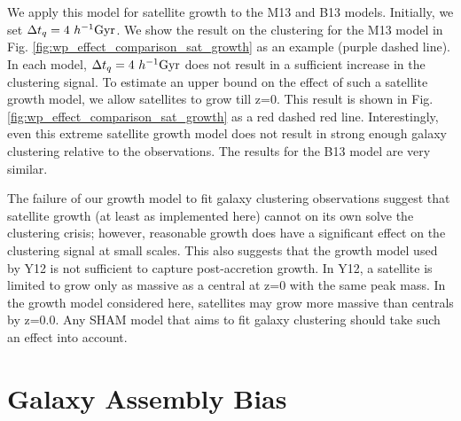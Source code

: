 \documentclass[a4paper,fleqn,usenatbib]{mnras}
\begin{document}
We apply this model for satellite growth to the M13 and B13 models.  Initially, we set $\Delta t_{q}=4 ~h^{-1}{\rm Gyr}$.  We show the result on the clustering for the M13 model in Fig. \ref{fig:wp_effect_comparison_sat_growth} as an example (purple dashed line).  In each model, $\Delta t_{q}=4 ~h^{-1}{\rm Gyr}$ does not result in a sufficient increase in the clustering signal.  To estimate an upper bound on the effect of such a satellite growth model, we allow satellites to grow till z=0.  This result is shown in Fig. \ref{fig:wp_effect_comparison_sat_growth} as a red dashed red line.  Interestingly, even this extreme satellite growth model does not result in strong enough galaxy clustering relative to the observations.  The results for the B13 model are very similar.  

The failure of our growth model to fit galaxy clustering observations suggest that satellite growth (at least as implemented here) cannot on its own solve the clustering crisis; however, reasonable growth does have a significant effect on the clustering signal at small scales.  This also suggests that the growth model used by Y12 is not sufficient to capture post-accretion growth.  In Y12, a satellite is limited to grow only as massive as a central at z=0 with the same peak mass.  In the growth model considered here, satellites may grow more massive than centrals by z=0.0.  Any SHAM model that aims to fit galaxy clustering should take such an effect into account.  


\section{Galaxy Assembly Bias}
\label{sec:assem_bias} 
\end{document}
